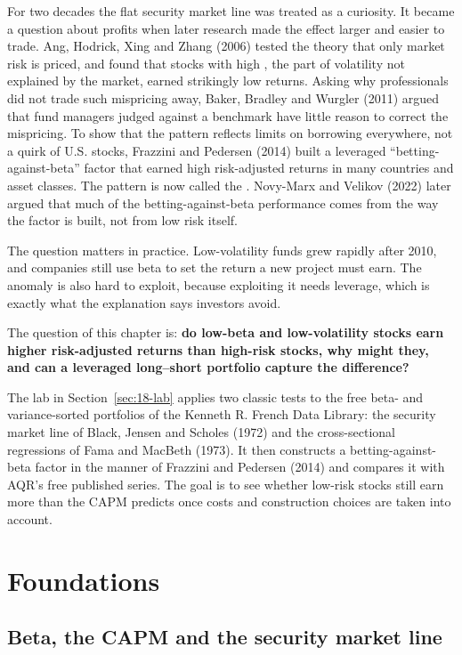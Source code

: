 For two decades the flat security market line was treated as a curiosity. It became a question about profits when later research made the effect larger and easier to trade. Ang, Hodrick, Xing and Zhang (2006) tested the theory that only market risk is priced, and found that stocks with high , the part of volatility not explained by the market, earned strikingly low returns. Asking why professionals did not trade such mispricing away, Baker, Bradley and Wurgler (2011) argued that fund managers judged against a benchmark have little reason to correct the mispricing. To show that the pattern reflects limits on borrowing everywhere, not a quirk of U.S. stocks, Frazzini and Pedersen (2014) built a leveraged ``betting-against-beta'' factor that earned high risk-adjusted returns in many countries and asset classes. The pattern is now called the . Novy-Marx and Velikov (2022) later argued that much of the betting-against-beta performance comes from the way the factor is built, not from low risk itself.

The question matters in practice. Low-volatility funds grew rapidly after 2010, and companies still use beta to set the return a new project must earn. The anomaly is also hard to exploit, because exploiting it needs leverage, which is exactly what the explanation says investors avoid. 

The question of this chapter is: \textbf{do low-beta and low-volatility stocks earn higher risk-adjusted returns than high-risk stocks, why might they, and can a leveraged long--short portfolio capture the difference?}

The lab in Section~\ref{sec:18-lab} applies two classic tests to the free beta- and variance-sorted portfolios of the Kenneth R. French Data Library: the security market line of Black, Jensen and Scholes (1972) and the cross-sectional regressions of Fama and MacBeth (1973). It then constructs a betting-against-beta factor in the manner of Frazzini and Pedersen (2014) and compares it with AQR's free published series. The goal is to see whether low-risk stocks still earn more than the CAPM predicts once costs and construction choices are taken into account.


\section{Foundations}
\label{sec:18-foundations}

\subsection{Beta, the CAPM and the security market line}

